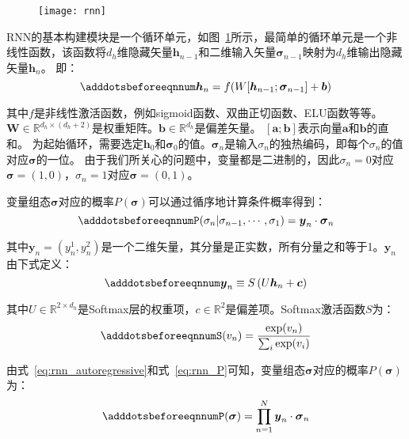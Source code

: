\begin{figure}[!htbp]
    \centering
    \texttt{[image: rnn]}
    \label{fig:rnn}
\end{figure}

RNN的基本构建模块是一个循环单元，如图~\ref{fig:rnn}所示，最简单的循环单元是一个非线性函数，该函数将$d_h$维隐藏矢量$\boldsymbol{h}_{n-1}$和二维输入矢量$\boldsymbol{\sigma}_{n-1}$映射为$d_h$维输出隐藏矢量$\boldsymbol{h}_n$。
即：
\begin{equation} \label{eq:rnn_h_n}
    \adddotsbeforeeqnnum%
    \boldsymbol{h}_{n} = f(W[\boldsymbol{h}_{n-1};\boldsymbol{\sigma}_{n-1}]+\boldsymbol{b})
\end{equation}

其中$f$是非线性激活函数，例如sigmoid函数、双曲正切函数、ELU函数等等。$\boldsymbol{W}\in \mathbb{R}^{d_{h}\times (d_{h}+2)}$是权重矩阵。$\boldsymbol{b}\in \mathbb{R}^{d_h}$是偏差矢量。
$[\boldsymbol{a};\boldsymbol{b}]$表示向量$\boldsymbol{a}$和$\boldsymbol{b}$的直和。
为起始循环，需要选定$\boldsymbol{h}_0$和$\boldsymbol{\sigma}_0$的值。$\boldsymbol{\sigma}_n$是输入$\sigma_n$的独热编码，即每个$\sigma_n$的值对应$\boldsymbol{\sigma}$的一位。
由于我们所关心的问题中，变量都是二进制的，因此$\sigma_{n}=0$对应$\boldsymbol{\sigma}=(1,0)$，$\sigma_{n}=1$对应$\boldsymbol{\sigma}=(0,1)$。

变量组态$\boldsymbol{\sigma}$对应的概率$P(\boldsymbol{\sigma})$可以通过循序地计算条件概率得到：
\begin{equation} \label{eq:rnn_P}
    \adddotsbeforeeqnnum%
    P(\sigma_{n}|\sigma_{n-1},\cdots,\sigma_1)=\boldsymbol{y}_{n}\cdot \boldsymbol{\sigma}_n
\end{equation}

其中$\boldsymbol{y}_n=(y_{n}^{1},y_{n}^{2})$是一个二维矢量，其分量是正实数，所有分量之和等于1。$\boldsymbol{y}_{n}$由下式定义：
\begin{equation} \label{eq:rnn_y_n}
    \adddotsbeforeeqnnum%
    \boldsymbol{y}_n \equiv S\left(U \boldsymbol{h}_n+\boldsymbol{c}\right)
\end{equation}

其中$U\in \mathbb{R}^{2\times d_{h}}$是Softmax层的权重项，$c\in \mathbb{R}^{2}$是偏差项。Softmax激活函数$S$为：
\begin{equation} \label{eq:softmax}
    \adddotsbeforeeqnnum%
    S(v_{n})=\frac{\text{exp}(v_n)}{\sum_{i}\text{exp}(v_i)}
\end{equation}

由式~\eqref{eq:rnn_autoregressive}和式~\eqref{eq:rnn_P}可知，变量组态$\boldsymbol{\sigma}$对应的概率$P(\boldsymbol{\sigma})$为：
\begin{equation}
    \adddotsbeforeeqnnum%
    P(\boldsymbol{\sigma})=\prod_{n=1}^{N}\boldsymbol{y}_{n}\cdot \boldsymbol{\sigma}_n
\end{equation}

